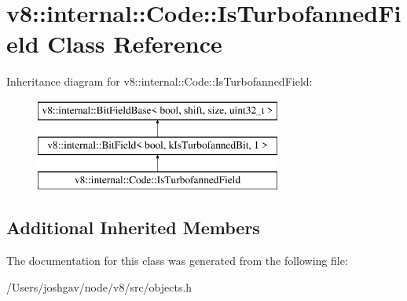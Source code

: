 \hypertarget{classv8_1_1internal_1_1_code_1_1_is_turbofanned_field}{}\section{v8\+:\+:internal\+:\+:Code\+:\+:Is\+Turbofanned\+Field Class Reference}
\label{classv8_1_1internal_1_1_code_1_1_is_turbofanned_field}
Inheritance diagram for v8\+:\+:internal\+:\+:Code\+:\+:Is\+Turbofanned\+Field\+:\begin{figure}[H]
\begin{center}
\leavevmode
\includegraphics[height=3.000000cm]{classv8_1_1internal_1_1_code_1_1_is_turbofanned_field}
\end{center}
\end{figure}
\subsection*{Additional Inherited Members}


The documentation for this class was generated from the following file\+:\begin{DoxyCompactItemize}
\item 
/\+Users/joshgav/node/v8/src/objects.\+h\end{DoxyCompactItemize}

